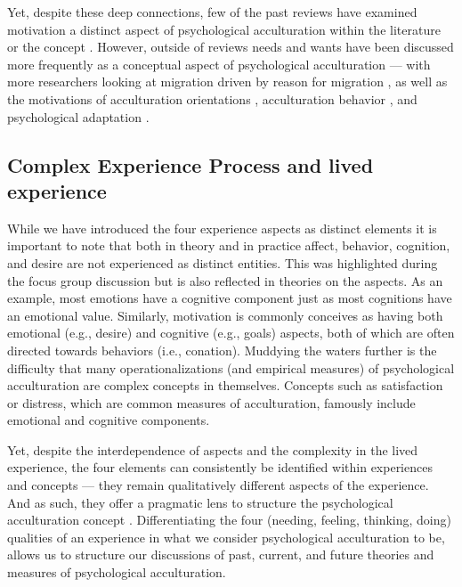 \documentclass[man, 12pt, a4paper]{apa7}
\begin{document}
Yet, despite these deep connections, few of the past reviews have examined motivation a distinct aspect of psychological acculturation within the literature or the concept \citep[including,][]{Ward2001a, Ward2019}. However, outside of reviews needs and wants have been discussed more frequently as a conceptual aspect of psychological acculturation --- with more researchers looking at migration driven by reason for migration \citep{Sandu2018}, as well as the motivations of acculturation orientations \citep{Recker2017a}, acculturation behavior \citep{Reece2000}, and psychological adaptation \citep{Safdar2003}. 

\subsection{Complex Experience Process and lived experience}
While we have introduced the four experience aspects as distinct elements it is important to note that both in theory and in practice affect, behavior, cognition, and desire are not experienced as distinct entities. This was highlighted during the focus group discussion but is also reflected in theories on the aspects. As an example, most emotions have a cognitive component just as most cognitions have an emotional value. Similarly, motivation is commonly conceives as having both emotional (e.g., desire) and cognitive (e.g., goals) aspects, both of which are often directed towards behaviors (i.e., conation). Muddying the waters further is the difficulty that many operationalizations (and empirical measures) of psychological acculturation are complex concepts in themselves. Concepts such as satisfaction or distress, which are common measures of acculturation, famously include emotional and cognitive components. 

Yet, despite the interdependence of aspects and the complexity in the lived experience, the four elements can consistently be identified within experiences and concepts --- they remain qualitatively different aspects of the experience. And as such, they offer a pragmatic lens to structure the psychological acculturation concept \citep{Kuhn1962}. Differentiating the four (needing, feeling, thinking, doing) qualities of an experience in what we consider psychological acculturation to be, allows us to structure our discussions of past, current, and future theories and measures of psychological acculturation.
\end{document}
